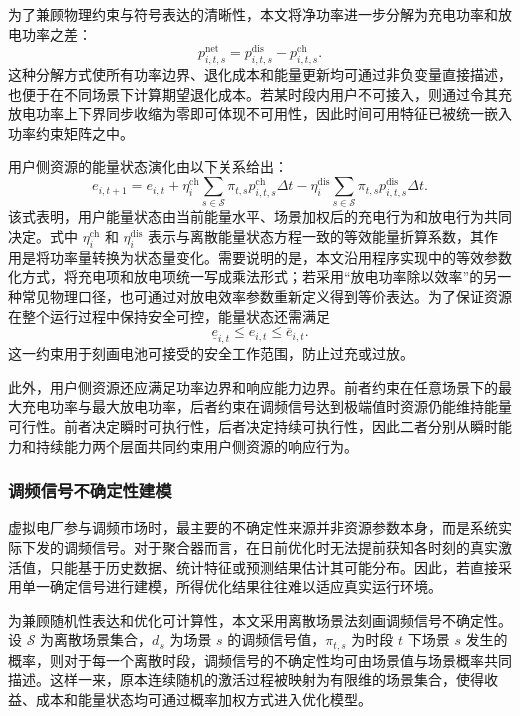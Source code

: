为了兼顾物理约束与符号表达的清晰性，本文将净功率进一步分解为充电功率和放电功率之差：
\begin{equation}
p_{i,t,s}^{\mathrm{net}} = p_{i,t,s}^{\mathrm{dis}} - p_{i,t,s}^{\mathrm{ch}}.
\end{equation}
这种分解方式使所有功率边界、退化成本和能量更新均可通过非负变量直接描述，也便于在不同场景下计算期望退化成本。若某时段内用户不可接入，则通过令其充放电功率上下界同步收缩为零即可体现不可用性，因此时间可用特征已被统一嵌入功率约束矩阵之中。

用户侧资源的能量状态演化由以下关系给出：
\begin{equation}
e_{i,t+1} = e_{i,t}
+ \eta_i^{\mathrm{ch}} \sum_{s \in \mathcal{S}} \pi_{t,s} p_{i,t,s}^{\mathrm{ch}} \Delta t
- \eta_i^{\mathrm{dis}} \sum_{s \in \mathcal{S}} \pi_{t,s} p_{i,t,s}^{\mathrm{dis}} \Delta t.
\end{equation}
该式表明，用户能量状态由当前能量水平、场景加权后的充电行为和放电行为共同决定。式中 $\eta_i^{\mathrm{ch}}$ 和 $\eta_i^{\mathrm{dis}}$ 表示与离散能量状态方程一致的等效能量折算系数，其作用是将功率量转换为状态量变化。需要说明的是，本文沿用程序实现中的等效参数化方式，将充电项和放电项统一写成乘法形式；若采用“放电功率除以效率”的另一种常见物理口径，也可通过对放电效率参数重新定义得到等价表达。为了保证资源在整个运行过程中保持安全可控，能量状态还需满足
\begin{equation}
\underline e_{i,t} \le e_{i,t} \le \overline e_{i,t}.
\end{equation}
这一约束用于刻画电池可接受的安全工作范围，防止过充或过放。

此外，用户侧资源还应满足功率边界和响应能力边界。前者约束在任意场景下的最大充电功率与最大放电功率，后者约束在调频信号达到极端值时资源仍能维持能量可行性。前者决定瞬时可执行性，后者决定持续可执行性，因此二者分别从瞬时能力和持续能力两个层面共同约束用户侧资源的响应行为。

\subsubsection{调频信号不确定性建模}
\label{subsubsec:vpp_admm_model_user_signal_uncertainty}

虚拟电厂参与调频市场时，最主要的不确定性来源并非资源参数本身，而是系统实际下发的调频信号。对于聚合器而言，在日前优化时无法提前获知各时刻的真实激活值，只能基于历史数据、统计特征或预测结果估计其可能分布。因此，若直接采用单一确定信号进行建模，所得优化结果往往难以适应真实运行环境。

为兼顾随机性表达和优化可计算性，本文采用离散场景法刻画调频信号不确定性。设 $\mathcal{S}$ 为离散场景集合，$d_s$ 为场景 $s$ 的调频信号值，$\pi_{t,s}$ 为时段 $t$ 下场景 $s$ 发生的概率，则对于每一个离散时段，调频信号的不确定性均可由场景值与场景概率共同描述。这样一来，原本连续随机的激活过程被映射为有限维的场景集合，使得收益、成本和能量状态均可通过概率加权方式进入优化模型。

